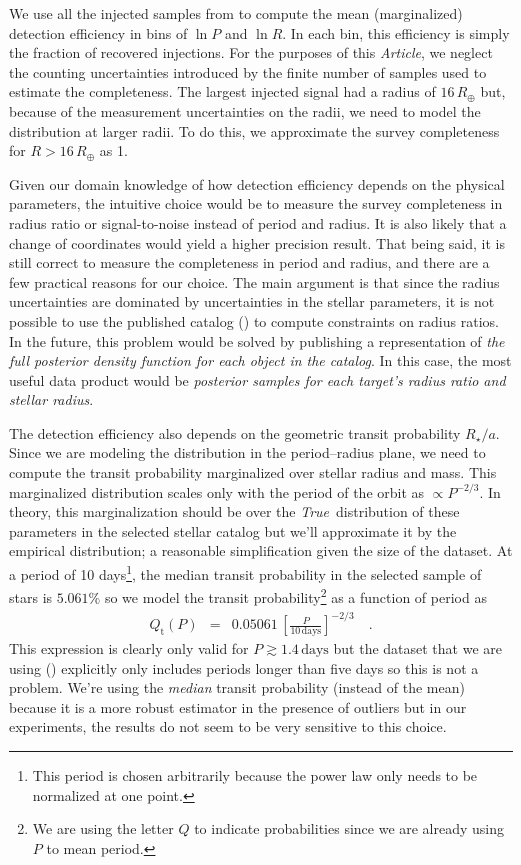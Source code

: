 \documentclass[12pt,preprint]{aastex}
\newcommand{\paper}{\textsl{Article}}
\newcommand{\foreign}[1]{\emph{#1}}
\newcommand{\True}{\foreign{True}}
\newcommand{\eqlabel}[1]{\label{eq:#1}}
\newcommand{\radius}{\ensuremath{R}}
\newcommand{\period}{\ensuremath{P}}
\newcommand{\transitprob}{{\ensuremath{Q_\mathrm{t}}}}
\begin{document}
We use all the injected samples from \citet{petigura} to compute the mean
(marginalized) detection efficiency in bins of $\ln\period$ and $\ln\radius$.
In each bin, this efficiency is simply the fraction of recovered injections.
For the purposes of this \paper, we neglect the counting uncertainties
introduced by the finite number of samples used to estimate the completeness.
The largest injected signal had a radius of $16\,R_\oplus$ but, because of the
measurement uncertainties on the radii, we need to model the distribution at
larger radii.
To do this, we approximate the survey completeness for $\radius>16\,R_\oplus$
as 1.

Given our domain knowledge of how detection efficiency depends on the physical
parameters, the intuitive choice would be to measure the survey completeness
in radius ratio or signal-to-noise instead of period and radius.
It is also likely that a change of coordinates would yield a higher precision
result.
That being said, it is still correct to measure the completeness in period and
radius, and there are a few practical reasons for our choice.
The main argument is that since the radius uncertainties are dominated by
uncertainties in the stellar parameters, it is not possible to use the
published catalog (\citealt{petigura}) to compute constraints on radius
ratios.
In the future, this problem would be solved by publishing a representation of
\emph{the full posterior density function for each object in the catalog}.
In this case, the most useful data product would be \emph{posterior samples
for each target's radius ratio and stellar radius}.

The detection efficiency also depends on the geometric transit probability
$R_\star/a$.
Since we are modeling the distribution in the period--radius plane, we need to
compute the transit probability marginalized over stellar radius and mass.
This marginalized distribution scales only with the period of the orbit as
$\propto \period^{-2/3}$.
In theory, this marginalization should be over the \True\ distribution of
these parameters in the selected stellar catalog but we'll approximate it by
the empirical distribution; a reasonable simplification given the size of the
dataset.
At a period of 10 days\footnote{This period is chosen arbitrarily because the
power law only needs to be normalized at one point.}, the median transit
probability in the selected sample of stars is $5.061\%$ so we model the
transit probability\footnote{We are using the letter $Q$ to indicate
probabilities since we are already using $P$ to mean period.} as a function of
period as
\begin{eqnarray}\eqlabel{transitprob}
\transitprob (\period) &=&
    0.05061\,\left[\frac{\period}{10\,\mathrm{days}}\right]^{-2/3} \quad.
\end{eqnarray}
This expression is clearly only valid for $\period \gtrsim 1.4\,\mathrm{days}$
but the dataset that we are using (\citealt{petigura}) explicitly only
includes periods longer than five days so this is not a problem.
We're using the \emph{median} transit probability (instead of the mean)
because it is a more robust estimator in the presence of outliers but in our
experiments, the results do not seem to be very sensitive to this choice.
\end{document}
